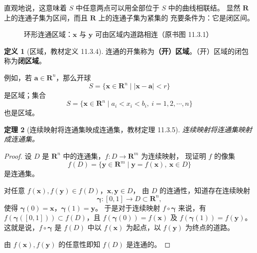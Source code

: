\documentclass[11pt]{ctexart}
\theoremstyle{plain}
\newtheorem{thm}{定理}[section]
\theoremstyle{definition}
\newtheorem{defn}[thm]{定义}
\theoremstyle{remark}
\begin{document}
直观地说，这意味着 \(S\) 中任意两点可以用全部位于 \(S\) 中的曲线相联结。
显然 \(\mathbf{R}\) 上的连通子集为区间，而且 \(\mathbf{R}\) 上的连通子集为紧集的
充要条件为：它是闭区间。

\begin{figure}[htbp]
  \centering
  \caption{环形连通区域：\(\boldsymbol{x}\) 与 \(\boldsymbol{y}\) 可由区域内道路相连（原书图 11.3.1）}
\end{figure}

\begin{defn}[区域，教材定义 11.3.4]\label{def:domain}
连通的开集称为\textbf{（开）区域}。（开）区域的闭包称为\textbf{闭区域}。
\end{defn}

例如，若 \(\boldsymbol{a}\in\mathbf{R}^n\)，那么开球
\[
  S=\{\boldsymbol{x}\in\mathbf{R}^n\mid |\boldsymbol{x}-\boldsymbol{a}|<r\}
\]
是区域；集合
\[
  S=\{\boldsymbol{x}\in\mathbf{R}^n\mid a_i<x_i<b_i,\ i=1,2,\cdots,n\}
\]
也是区域。

\begin{thm}[连续映射将连通集映成连通集，教材定理 11.3.5]\label{thm:imageconn}
连续映射将连通集映射成连通集。
\end{thm}

\begin{proof}
设 \(D\) 是 \(\mathbf{R}^n\) 中的连通集，\(f\colon D\to\mathbf{R}^m\) 为连续映射，
现证明 \(f\) 的像集
\[
  f(D)=\{\boldsymbol{y}\in\mathbf{R}^m\mid \boldsymbol{y}=f(\boldsymbol{x}),\ \boldsymbol{x}\in D\}
\]
是连通集。

对任意 \(f(\boldsymbol{x}),f(\boldsymbol{y})\in f(D)\)，\(\boldsymbol{x},\boldsymbol{y}\in D\)，
由 \(D\) 的连通性，知道存在连续映射
\[
  \boldsymbol{\gamma}\colon[0,1]\to D\subset\mathbf{R}^n,
\]
使得 \(\boldsymbol{\gamma}(0)=\boldsymbol{x}\)，\(\boldsymbol{\gamma}(1)=\boldsymbol{y}\)。
于是对于连续映射 \(f\circ\boldsymbol{\gamma}\) 来说，有
\(f(\boldsymbol{\gamma}([0,1]))\subset f(D)\)，且
\(f(\boldsymbol{\gamma}(0))=f(\boldsymbol{x})\) 及
\(f(\boldsymbol{\gamma}(1))=f(\boldsymbol{y})\)。这就是说，\(f\circ\boldsymbol{\gamma}\)
是 \(f(D)\) 中以 \(f(\boldsymbol{x})\) 为起点，以 \(f(\boldsymbol{y})\) 为终点的道路。

由 \(f(\boldsymbol{x}),f(\boldsymbol{y})\) 的任意性即知 \(f(D)\) 是连通的。
\end{proof}
\end{document}
